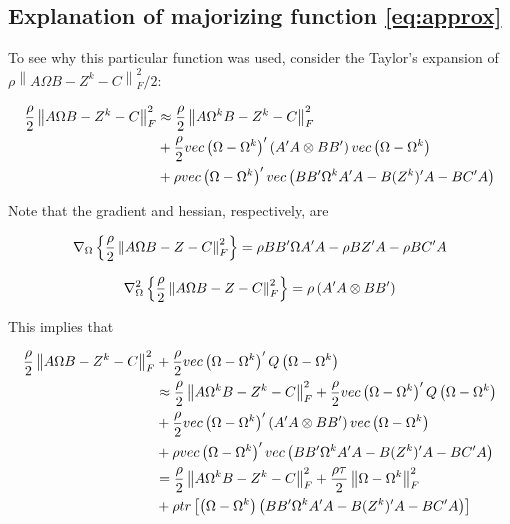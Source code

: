 \documentclass[11pt,]{report}
\theoremstyle{definition}
\theoremstyle{definition}
\theoremstyle{definition}
\theoremstyle{remark}
\begin{document}
\hypertarget{taylorsexp}{%
\subsection{Explanation of majorizing function \eqref{eq:approx}}\label{taylorsexp}}

To see why this particular function was used, consider the Taylor's expansion of \(\rho\left\|A\Omega B - Z^{k} - C\right\|_{F}^{2}/2\):

\begin{equation}
\begin{split}
  \frac{\rho}{2}\left\| A\Omega B - Z^{k} - C \right\|_{F}^{2} &\approx \frac{\rho}{2}\left\| A\Omega^{k} B - Z^{k} - C \right\|_{F}^{2} \\
  &+ \frac{\rho}{2}vec\left( \Omega - \Omega^{k}\right)'\left(A'A \otimes BB'\right)vec\left(\Omega - \Omega^{k}\right) \\
  &+ \rho vec\left(\Omega - \Omega^{k}\right)'vec\left(BB'\Omega^{k}A'A - B(Z^{k})'A - BC'A \right)
\label{eq:taylors}\notag
\end{split}
\end{equation}

Note that the gradient and hessian, respectively, are

\begin{equation}
  \nabla_{\Omega}\left\{ \frac{\rho}{2}\left\|A\Omega B - Z - C\right\|_{F}^{2} \right\} = \rho BB'\Omega A'A - \rho BZ'A - \rho BC'A
\label{eq:gradient}\notag
\end{equation}

\begin{equation}
\nabla_{\Omega}^{2}\left\{ \frac{\rho}{2}\left\|A\Omega B - Z - C \right\|_{F}^{2} \right\} = \rho\left(A'A \otimes BB' \right)
\label{eq:hessian}\notag
\end{equation}

This implies that

\begin{equation}
\begin{split}
  \frac{\rho}{2}\left\| A\Omega B - Z^{k} - C \right\|_{F}^{2} &+ \frac{\rho}{2}vec\left(\Omega - \Omega^{k} \right)'Q\left(\Omega - \Omega^{k} \right) \\
  &\approx \frac{\rho}{2}\left\| A\Omega^{k} B - Z^{k} - C \right\|_{F}^{2} + \frac{\rho}{2}vec\left(\Omega - \Omega^{k} \right)'Q\left(\Omega - \Omega^{k} \right) \\
  &+ \frac{\rho}{2}vec\left( \Omega - \Omega^{k}\right)'\left(A'A \otimes BB'\right)vec\left(\Omega - \Omega^{k}\right) \\
  &+ \rho vec\left(\Omega - \Omega^{k}\right)' vec\left(BB'\Omega^{k}A'A - B(Z^{k})'A - BC'A \right) \\
  &= \frac{\rho}{2}\left\| A\Omega^{k} B - Z^{k} - C \right\|_{F}^{2} + \frac{\rho\tau}{2}\left\|\Omega - \Omega^{k}\right\|_{F}^{2} \\
  &+ \rho tr\left[\left(\Omega - \Omega^{k}\right)\left(BB'\Omega^{k}A'A - B(Z^{k})'A - BC'A \right)\right]
\label{eq:penapprox}\notag
\end{split}
\end{equation}
\end{document}
